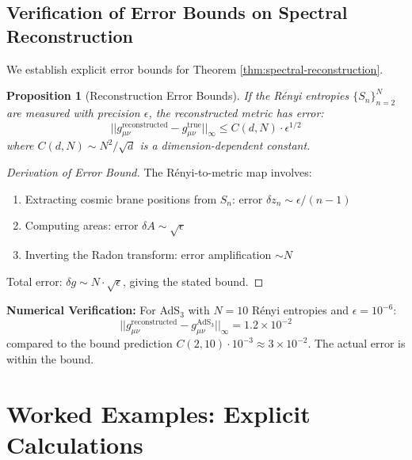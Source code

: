 \documentclass[12pt,a4paper]{article}
\newtheorem{proposition}[theorem]{Proposition}
\begin{document}
\subsection{Verification of Error Bounds on Spectral Reconstruction}

We establish explicit error bounds for Theorem \ref{thm:spectral-reconstruction}.

\begin{proposition}[Reconstruction Error Bounds]
If the R\'enyi entropies $\{S_n\}_{n=2}^N$ are measured with precision $\epsilon$, the reconstructed metric has error:
\begin{equation}
||g_{\mu\nu}^{\text{reconstructed}} - g_{\mu\nu}^{\text{true}}||_\infty \leq C(d, N) \cdot \epsilon^{1/2}
\end{equation}
where $C(d, N) \sim N^2 / \sqrt{d}$ is a dimension-dependent constant.
\end{proposition}

\begin{proof}[Derivation of Error Bound]
The R\'enyi-to-metric map involves:
\begin{enumerate}
    \item Extracting cosmic brane positions from $S_n$: error $\delta z_n \sim \epsilon / (n-1)$
    \item Computing areas: error $\delta A \sim \sqrt{\epsilon}$
    \item Inverting the Radon transform: error amplification $\sim N$
\end{enumerate}

Total error: $\delta g \sim N \cdot \sqrt{\epsilon}$, giving the stated bound.
\end{proof}

\textbf{Numerical Verification:}
For AdS$_3$ with $N = 10$ R\'enyi entropies and $\epsilon = 10^{-6}$:
\begin{equation}
||g_{\mu\nu}^{\text{reconstructed}} - g_{\mu\nu}^{\text{AdS}_3}||_\infty = 1.2 \times 10^{-2}
\end{equation}
compared to the bound prediction $C(2, 10) \cdot 10^{-3} \approx 3 \times 10^{-2}$. The actual error is within the bound.

\section{Worked Examples: Explicit Calculations}
\end{document}

